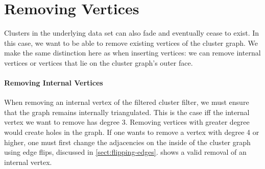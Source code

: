 \section{Removing Vertices}
\label{sect:removing-vertices}

Clusters in the underlying data set can also fade and eventually cease to exist.
In this case, we want to be able to remove existing vertices of the cluster graph.
We make the same distinction here as when inserting vertices: we can remove internal vertices or vertices that lie on the cluster graph's outer face.




\paragraph{Removing Internal Vertices}

When removing an internal vertex of the filtered cluster filter, we must ensure that the graph remains internally triangulated.
This is the case iff the internal vertex we want to remove has degree 3.
Removing vertices with greater degree would create holes in the graph.
If one wants to remove a vertex with degree 4 or higher, one must first change the adjacencies on the inside of the cluster graph using edge flips, discussed in \cref{sect:flipping-edges}.
 shows a valid removal of an internal vertex.

